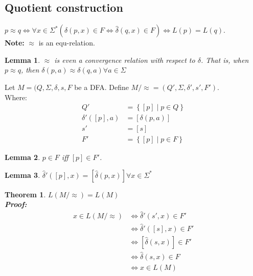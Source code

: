 \documentclass[a4paper]{article}
\newtheorem{lemma}{Lemma}
\newtheorem{theorem}{Theorem}
\begin{document}
\subsection{Quotient construction}
$p \approx q \Leftrightarrow \forall x\in \Sigma^* (\hat{\delta}(p,x)\in F \Leftrightarrow \hat{\delta}(q,x) \in F) \Leftrightarrow L(p)=L(q)$.
\\\textbf{Note:} $\approx$ is an equ-relation.
\begin{lemma}
    $\approx$ is even a convergence relation with respect to $\delta$. That is,
    when $p\approx q$, then $\delta(p,a) \approx \delta(q,a) \forall a\in \Sigma$
\end{lemma}
Let $M=(Q,\Sigma, \delta, s, F$ be a DFA. Define $M/\approx = (Q', \Sigma, \delta', s', F')$.
\\Where:
\begin{align*}
    Q'&=\left\{ \left[ p \right]\middle | p \in Q \right\}\\
    \delta'(\left[ p \right], a) &= \left[ \delta(p,a) \right]\\
    s' &= \left[ s \right]\\
    F' &= \left\{ \left[ p \right] \middle | p\in F \right\}
\end{align*}

\begin{lemma}
    $p\in F$ iff $\left[ p \right]\in F'$.
\end{lemma}
\begin{lemma}
    $\hat{\delta}'(\left[ p \right],x)=\left[ \hat{\delta}(p,x) \right] \forall x\in \Sigma^*$
\end{lemma}
\begin{theorem}
        $L(M/\approx)=L(M)$\\
        \textbf{Proof:} 
        \begin{align*}
            x\in L(M/\approx) &\Leftrightarrow \hat{\delta}'(s',x)\in F'\\
            &\Leftrightarrow \hat{\delta}'(\left[ s \right],x)\in F' \\
            &\Leftrightarrow \left[ \hat{\delta}(s,x) \right] \in F'\\
            &\Leftrightarrow \hat{\delta}(s,x) \in F \\
            &\Leftrightarrow x\in L(M)
        \end{align*}
    \end{theorem}
\end{document}
